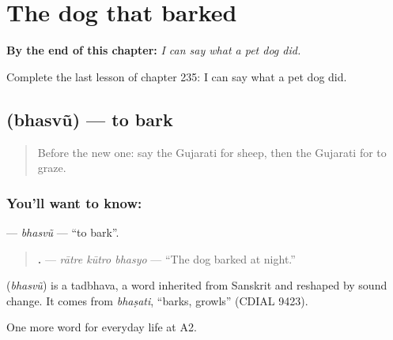
\chapter{The dog that barked}
\label{ch:gu-the-dog-that-barked}

\begin{chapteropening}
\textbf{By the end of this chapter:} \emph{I can say what a pet dog did.}

Complete the last lesson of chapter 235: I can say what a pet dog did.
\end{chapteropening}

\section[\texorpdfstring{\gu{ભસવું} (bhasvũ)}{ભસવું (bhasvũ)}]{ (bhasvũ) — to bark}

\label{lesson:GU-C235-bhasvu}



\begin{quote}
Before the new one: say the Gujarati for sheep, then the Gujarati for to graze.
\end{quote}

\subsection*{You'll want to know: }
\textbf{} — \emph{bhasvũ} — \textquotedblleft{}to bark\textquotedblright{}.

\begin{quote}
\textbf{  .} — \emph{rātre kūtro bhasyo} — \textquotedblleft{}The dog barked at night.\textquotedblright{}
\end{quote}

\begin{cousinweb}
\textbf{} (\emph{bhasvũ}) is a tadbhava, a word inherited from Sanskrit and reshaped by sound change. It comes from \emph{bhaṣati}, \textquotedblleft{}barks, growls\textquotedblright{} (CDIAL 9423).
\end{cousinweb}

\begin{grammarlens}[title={What you've built}]
One more word for everyday life at A2.
\end{grammarlens}

